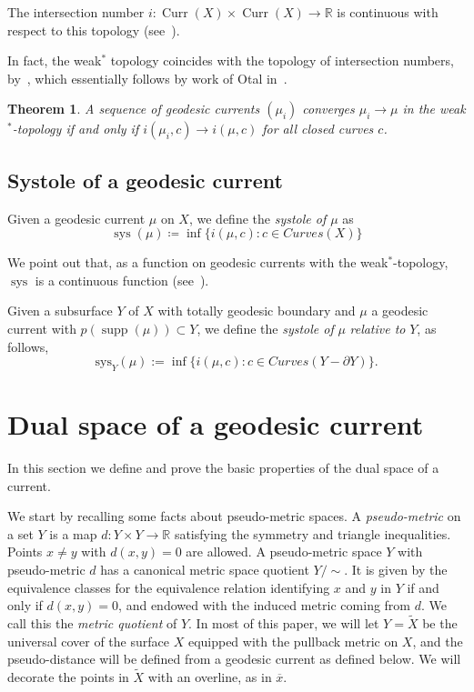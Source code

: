 \documentclass[12pt,article]{amsart}
\numberwithin{equation}{section}
\numberwithin{figure}{section}
\newtheorem{theorem}[equation]{Theorem}
\theoremstyle{definition}
\theoremstyle{plain}
\DeclareMathOperator{\Curr}{Curr}
\DeclareMathOperator{\sys}{sys}
\newcommand*{\wt}[1]{\widetilde{#1}}
\newcommand{\Curves}{\mathit{Curves}}
\DeclareMathOperator{\supp}{supp}
\begin{document}
The intersection number $i \colon \Curr(X) \times \Curr(X) \to \mathbb{R}$ is continuous with respect to this topology (see~\cite[Proposition~4.5]{Bonahon86:EndsHyperbolicManifolds}).

In fact, the weak$^*$ topology coincides with the topology of intersection numbers, by~\cite[Theorem~11]{DLR10:DegenerationFlatMetrics}, which essentially follows by work of Otal in~\cite[Th\'eor\`eme~2]{Otal90:SpectreMarqueNegative}.

\begin{theorem}
A sequence of geodesic currents $(\mu_i)$ converges $\mu_i \to \mu$ in the weak$^*$-topology if and only if $i(\mu_i,c) \to i(\mu,c)$ for all closed curves $c$.
\label{thm:weakintersection}
\end{theorem}



\subsection{Systole of a geodesic current}
\label{subsec:systole}

Given a geodesic current $\mu$ on $X$, we define the \emph{systole of $\mu$} as 
\[
\sys(\mu) \coloneqq \inf \{ i(\mu,c) : c \in \Curves(X)\}
\]

We point out that, as a function on geodesic currents with the weak$^*$-topology, $\sys$ is a continuous function (see~\cite[Corollary~1.5(1)]{BIPP21:Currents}).

Given a subsurface $Y$ of $X$ with totally geodesic boundary and $\mu$ a geodesic current with $p(\supp(\mu)) \subset Y$, we define the \emph{systole of} $\mu$ \emph{relative to} $Y$, as follows,
\begin{equation*}
\mathrm{sys}_{Y} (\mu) := \inf \{ i (\mu, c) : c \in \Curves(Y - \partial Y)\}. 
\end{equation*}

 
 \section{Dual space of a geodesic current}
\label{sec:currentdual}

In this section we define and prove the basic properties of the dual space of a current.

We start by recalling some facts about pseudo-metric spaces.
 A \emph{pseudo-metric} on a set $Y$ is a map $d \colon Y \times Y \to \mathbb{R}$ satisfying the symmetry and triangle inequalities. Points $x \neq y$ with $d(x,y)=0$ are allowed.
 A pseudo-metric space $Y$ with pseudo-metric $d$ has a canonical metric space quotient $Y / \sim$. It is given by the equivalence classes for the equivalence relation identifying $x$ and $y$ in $Y$ if and only if $d(x,y)=0$, and endowed with the induced metric coming from $d$. We call this the \emph{metric quotient} of $Y$. 
  In most of this paper, we will let $Y=\wt{X}$ be the universal cover of the surface $X$ equipped with the pullback metric on $X$, and the pseudo-distance will be defined from a geodesic current as defined below.
  We will decorate the points in $\wt{X}$ with an overline, as in $\overline{x}$. 
\end{document}
